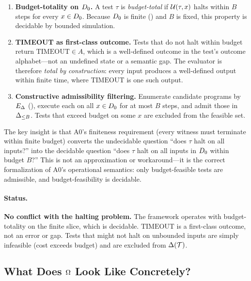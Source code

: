 \begin{enumerate}[nosep]
  \item \textbf{Budget-totality on $D_0$.}  A test $\tau$ is
        \emph{budget-total} if $\mathcal{U}(\tau, x)$ halts within $B$ steps for
        every $x \in D_0$.  Because $D_0$ is finite ()
        and $B$ is fixed, this property is decidable by bounded simulation.
  \item \textbf{TIMEOUT as first-class outcome.}  Tests that do not halt
        within budget return $\mathrm{TIMEOUT} \in A$, which is a
        well-defined outcome in the test's outcome alphabet---not an
        undefined state or a semantic gap.  The evaluator is therefore
        \emph{total by construction}: every input produces a well-defined
        output within finite time, where $\mathrm{TIMEOUT}$ is one such
        output.
  \item \textbf{Constructive admissibility filtering.}  Enumerate candidate
        programs by $E_\Delta$ (), execute each on all
        $x \in D_0$ for at most $B$ steps, and admit those in
        $\Delta_{\leq B}$.  Tests that exceed budget on some $x$ are excluded
        from the feasible set.
\end{enumerate}

The key insight is that A0's finiteness requirement (every witness must
terminate within finite budget) converts the undecidable question ``does
$\tau$ halt on all inputs?'' into the decidable question ``does $\tau$
halt on all inputs in $D_0$ within budget $B$?''  This is not an
approximation or workaround---it is the correct formalization of A0's
operational semantics: only budget-feasible tests are admissible, and
budget-feasibility is decidable.

\paragraph{Status.}
\textbf{No conflict with the halting problem.}  The framework operates
with budget-totality on the finite slice, which is decidable.
$\mathrm{TIMEOUT}$ is a first-class outcome, not an error or gap.
Tests that might not halt on unbounded inputs are simply infeasible
(cost exceeds budget) and are excluded from $\Delta(\mathcal{T})$.

\subsection{What Does $\Omega$ Look Like Concretely?}
\label{app:oq:omega}

